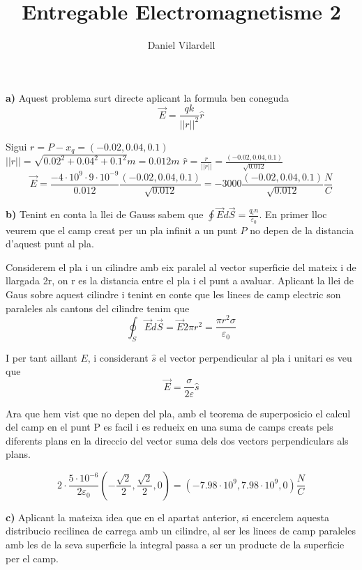 \documentclass[12pt, a4papre]{article}
\author{Daniel Vilardell}
\title{Entregable Electromagnetisme 2}
\date{}
\begin{document}
	\maketitle
	\section{} 
	
	\textbf{a)} Aquest problema surt directe aplicant la formula ben coneguda 
	\[
	\vec{E} = \frac{qk}{||r||^2}\hat{r}
	\]
	
	Sigui $r = P - x_q = (-0.02, 0.04, 0.1)$\\
	
	$||r|| = \sqrt{0.02^2+0.04^2+0.1^2} m= 0.012 m$
	$\hat{r} = \frac{r}{||r||} = \frac{(-0.02, 0.04, 0.1)}{\sqrt{0.012}}$
	\[
	\vec{E} = \frac{-4\cdot 10^9 \cdot 9\cdot 10^{-9}}{0.012}\frac{(-0.02, 0.04, 0.1)}{\sqrt{0.012}}=-3000\frac{(-0.02, 0.04, 0.1)}{\sqrt{0.012}} \frac{N}{C}
	\]
	
	\textbf{b)} Tenint en conta la llei de Gauss sabem que $\oint \vec{E}d\vec{S} = \frac{q_in}{\varepsilon_0}$. En primer lloc veurem que el camp creat per un pla infinit a un punt $P$ no depen de la distancia d'aquest punt al pla. 
	
	Considerem el pla i un cilindre amb eix paralel al vector superficie del mateix i de llargada 2r, on r es la distancia entre el pla i el punt a avaluar. Aplicant la llei de Gaus sobre aquest cilindre i tenint en conte que les linees de camp electric son paraleles als cantons del cilindre tenim que
	\[
	\oint_S\vec{E}d\vec{S}=\vec{E}2\pi r^2=\frac{\pi r^2 \sigma}{\varepsilon_0}
	\]
 
 	I per tant aillant $E$, i considerant $\hat{s}$ el vector perpendicular al pla i unitari es veu que 
	\[
	\vec{E} = \frac{\sigma}{2\varepsilon}\hat{s}
	\]
	
	Ara que hem vist que no depen del pla, amb el teorema de superposicio el calcul del camp en el punt P es facil i es redueix en una suma de camps creats pels diferents plans en la direccio del vector suma dels dos vectors perpendiculars als plans.
	
	\[
	2\cdot\frac{5\cdot 10^{-6}}{2\varepsilon_0}(-\frac{\sqrt{2}}{2},\frac{\sqrt{2}}{2}, 0) = (-7.98\cdot10^9,7.98\cdot10^9, 0)  \frac{N}{C}
	\]
	
	\textbf{c)} Aplicant la mateixa idea que en el apartat anterior, si encerclem aquesta distribucio recilinea de carrega amb un cilindre, al ser les linees de camp paraleles amb les de la seva superficie la integral passa a ser un producte de la superficie per el camp. 
	
\end{document}
